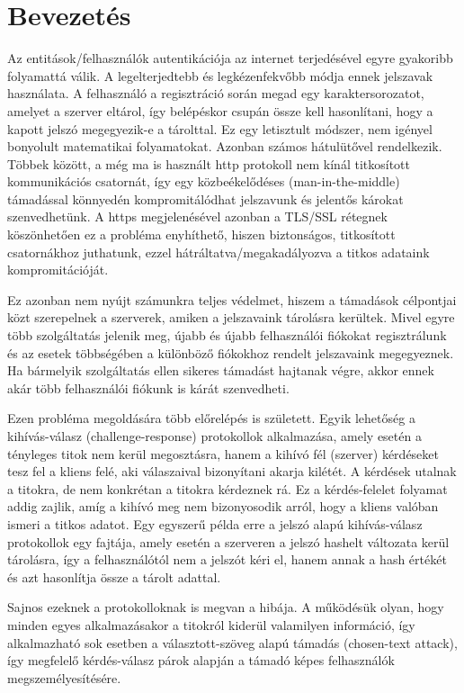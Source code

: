 \chapter{Bevezetés}

Az entitások/felhasználók autentikációja az internet terjedésével egyre gyakoribb folyamattá válik. A legelterjedtebb és legkézenfekvőbb módja ennek jelszavak használata. A felhasználó a regisztráció során megad egy karaktersorozatot, amelyet a szerver eltárol, így belépéskor csupán össze kell hasonlítani, hogy a kapott jelszó megegyezik-e a tárolttal. Ez egy letisztult módszer, nem igényel bonyolult matematikai folyamatokat. Azonban számos hátulütővel rendelkezik. Többek között, a még ma is használt http protokoll nem kínál titkosított kommunikációs csatornát, így egy közbeékelődéses (man-in-the-middle) támadással könnyedén kompromitálódhat jelszavunk és jelentős károkat szenvedhetünk. A https megjelenésével azonban a TLS/SSL rétegnek köszönhetően ez a probléma enyhíthető, hiszen biztonságos, titkosított csatornákhoz juthatunk, ezzel hátráltatva/megakadályozva a titkos adataink kompromitációját.

Ez azonban nem nyújt számunkra teljes védelmet, hiszem a támadások célpontjai közt szerepelnek a szerverek, amiken a jelszavaink tárolásra kerültek. Mivel egyre több szolgáltatás jelenik meg, újabb és újabb felhasználói fiókokat regisztrálunk és az esetek többségében a különböző fiókokhoz rendelt jelszavaink megegyeznek. Ha bármelyik szolgáltatás ellen sikeres támadást hajtanak végre, akkor ennek akár több felhasználói fiókunk is kárát szenvedheti.

Ezen probléma megoldására több előrelépés is született. Egyik lehetőség a kihívás-válasz (challenge-response) protokollok alkalmazása, amely esetén a tényleges titok nem kerül megosztásra, hanem a kihívó fél (szerver) kérdéseket tesz fel a kliens felé, aki válaszaival bizonyítani akarja kilétét. A kérdések utalnak a titokra, de nem konkrétan a titokra kérdeznek rá. Ez a kérdés-felelet folyamat addig zajlik, amíg a kihívó meg nem bizonyosodik arról, hogy a kliens valóban ismeri a titkos adatot. Egy egyszerű példa erre a jelszó alapú kihívás-válasz protokollok egy fajtája, amely esetén a szerveren a jelszó hashelt változata kerül tárolásra, így a felhasználótól nem a jelszót kéri el, hanem annak a hash értékét és azt hasonlítja össze a tárolt adattal.

Sajnos ezeknek a protokolloknak is megvan a hibája. A működésük olyan, hogy minden egyes alkalmazásakor a titokról kiderül valamilyen információ, így alkalmazható sok esetben a választott-szöveg alapú támadás (chosen-text attack), így megfelelő kérdés-válasz párok alapján a támadó képes felhasználók megszemélyesítésére.

